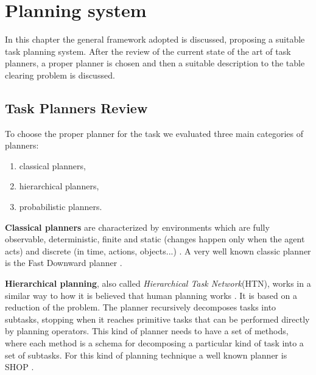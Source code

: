 \chapter{Planning system}
\label{ch:planning_system}
In this chapter the general framework adopted is discussed, proposing a suitable task planning system. After the  review of the current state of the art of task planners, a proper planner is chosen and then a suitable description to the table clearing problem is discussed.
\section{Task Planners Review}
To choose the proper planner for the task we evaluated three main categories of planners:
\begin{enumerate}
\item classical planners,
\item hierarchical planners,
\item probabilistic planners.
\end{enumerate}
\textbf{Classical planners} are characterized by environments which are fully observable, deterministic, finite and static (changes happen only when the agent acts) and discrete (in time, actions, objects...) \citep{artificialIntelligence}.  A very well known classic planner is the Fast Downward planner \cite{helmert2006fast}.


\textbf{Hierarchical planning}, also called \textit{Hierarchical Task Network}(HTN), works in a similar way to how it is believed that human planning 
works \citep{marthi2007angelic}. It is based on a reduction of the problem. The planner recursively decomposes tasks into subtasks, stopping when it reaches primitive tasks that can be performed directly by planning operators. This kind of planner needs to have a set of methods, where each method is a schema for decomposing a particular kind of task into a set of subtasks. For this kind of planning technique a well known planner is SHOP \citep{shop}.

